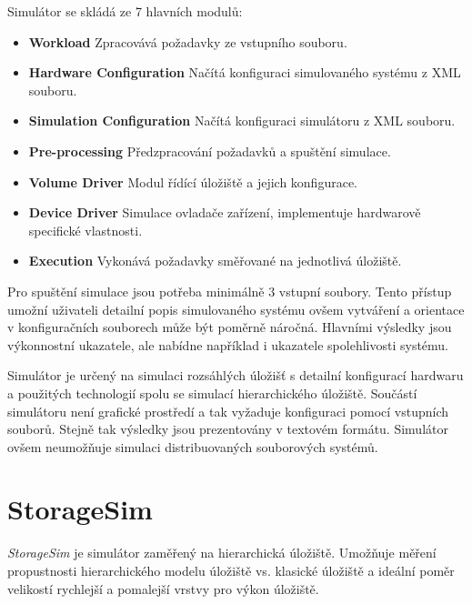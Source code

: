 \documentclass[czech,DP]{thesiskiv}
\begin{document}
Simulátor se skládá ze 7 hlavních modulů:

\begin{itemize}

\item \textbf{Workload} Zpracovává požadavky ze vstupního souboru.

\item \textbf{Hardware Configuration} Načítá konfiguraci simulovaného systému z XML souboru.

\item \textbf{Simulation Configuration} Načítá konfiguraci simulátoru z XML souboru.

\item \textbf{Pre-processing} Předzpracování požadavků a spuštění simulace.

\item \textbf{Volume Driver} Modul řídící úložiště a jejich konfigurace.

\item \textbf{Device Driver} Simulace ovladače zařízení, implementuje hardwarově specifické vlastnosti.

\item \textbf{Execution} Vykonává požadavky směřované na jednotlivá úložiště.

\end{itemize}

Pro spuštění simulace jsou potřeba minimálně 3 vstupní soubory. Tento přístup umožní uživateli detailní popis simulovaného systému ovšem vytváření a orientace v konfiguračních souborech může být poměrně náročná. Hlavními výsledky jsou výkonnostní ukazatele, ale nabídne například i ukazatele spolehlivosti systému.

Simulátor je určený na simulaci rozsáhlých úložišť s detailní konfigurací hardwaru a použitých technologií spolu se simulací hierarchického úložiště. Součástí simulátoru není grafické prostředí a tak vyžaduje konfiguraci pomocí vstupních souborů. Stejně tak výsledky jsou prezentovány v textovém formátu. Simulátor ovšem neumožňuje simulaci distribuovaných souborových systémů.

\section{StorageSim}

\textit{StorageSim} \cite{storagesimpaper} je simulátor zaměřený na hierarchická úložiště. Umožňuje měření propustnosti  hierarchického modelu úložiště vs. klasické úložiště a ideální poměr velikostí rychlejší a pomalejší vrstvy pro výkon úložiště.
\end{document}
